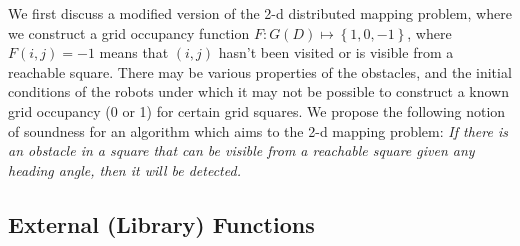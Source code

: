 We first discuss a modified version of the 2-d distributed mapping problem, where we construct a grid occupancy function $F: G(D) \mapsto \left\{1,0,-1\right\}$, where $F(i,j) = -1$ means that $(i,j)$ hasn't been visited or is visible from a reachable square. There may be various properties of the obstacles, and the initial conditions of the robots under which it may not be possible to construct a known grid occupancy (0 or 1) for certain grid squares. We propose the following notion of soundness for an algorithm which aims to the 2-d mapping problem:
{\em If there is an obstacle in a square that can be visible from a reachable square given any heading angle, then it will be detected. }


\subsection{External (Library) Functions}
